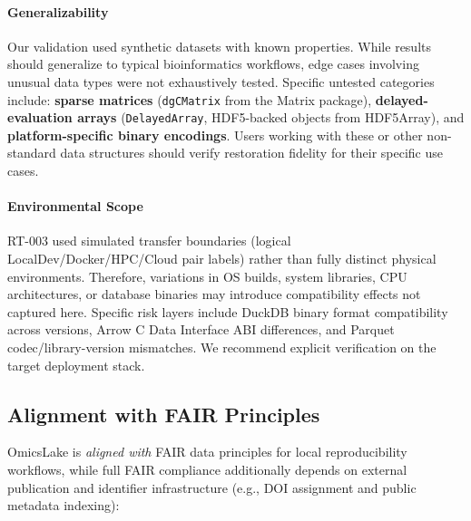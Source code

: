 \documentclass[11pt,a4paper]{article}
\begin{document}
\paragraph{Generalizability}
Our validation used synthetic datasets with known properties. While results should generalize to typical bioinformatics workflows, edge cases involving unusual data types were not exhaustively tested. Specific untested categories include: \textbf{sparse matrices} (\texttt{dgCMatrix} from the Matrix package), \textbf{delayed-evaluation arrays} (\texttt{DelayedArray}, HDF5-backed objects from HDF5Array), and \textbf{platform-specific binary encodings}. Users working with these or other non-standard data structures should verify restoration fidelity for their specific use cases.

\paragraph{Environmental Scope}
RT-003 used simulated transfer boundaries (logical LocalDev/Docker/HPC/Cloud pair labels) rather than fully distinct physical environments. Therefore, variations in OS builds, system libraries, CPU architectures, or database binaries may introduce compatibility effects not captured here. Specific risk layers include DuckDB binary format compatibility across versions, Arrow C Data Interface ABI differences, and Parquet codec/library-version mismatches. We recommend explicit verification on the target deployment stack.

\subsection{Alignment with FAIR Principles}

OmicsLake is \emph{aligned with} FAIR data principles \citep{wilkinson2016fair} for local reproducibility workflows, while full FAIR compliance additionally depends on external publication and identifier infrastructure (e.g., DOI assignment and public metadata indexing):
\end{document}
